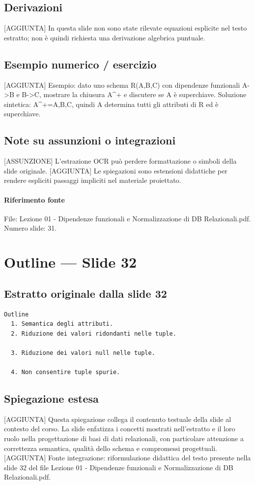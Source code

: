 \documentclass[11pt]{article}
\begin{document}
\subsection*{Derivazioni}
[AGGIUNTA] In questa slide non sono state rilevate equazioni esplicite nel testo estratto; non è quindi richiesta una derivazione algebrica puntuale.
\subsection*{Esempio numerico / esercizio}
[AGGIUNTA] Esempio: dato uno schema R(A,B,C) con dipendenze funzionali A->B e B->C, mostrare la chiusura A^+ e discutere se A è superchiave. Soluzione sintetica: A^+={A,B,C}, quindi A determina tutti gli attributi di R ed è superchiave.
\subsection*{Note su assunzioni o integrazioni}
[ASSUNZIONE] L'estrazione OCR può perdere formattazione o simboli della slide originale.
[AGGIUNTA] Le spiegazioni sono estensioni didattiche per rendere espliciti passaggi impliciti nel materiale proiettato.
\paragraph{Riferimento fonte} File: Lezione 01 - Dipendenze funzionali e Normalizzazione di DB Relazionali.pdf. Numero slide: 31.
\section{Outline --- Slide 32}
\subsection*{Estratto originale dalla slide 32}
\begin{lstlisting}
Outline
  1. Semantica degli attributi.
  2. Riduzione dei valori ridondanti nelle tuple.

  3. Riduzione dei valori null nelle tuple.

  4. Non consentire tuple spurie.
\end{lstlisting}
\subsection*{Spiegazione estesa}
[AGGIUNTA] Questa spiegazione collega il contenuto testuale della slide al contesto del corso. La slide enfatizza i concetti mostrati nell'estratto e il loro ruolo nella progettazione di basi di dati relazionali, con particolare attenzione a correttezza semantica, qualità dello schema e compromessi progettuali.
[AGGIUNTA] Fonte integrazione: riformulazione didattica del testo presente nella slide 32 del file Lezione 01 - Dipendenze funzionali e Normalizzazione di DB Relazionali.pdf.
\end{document}
